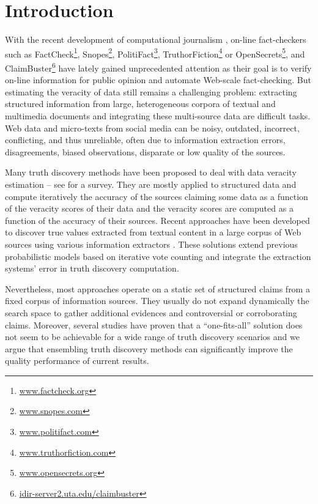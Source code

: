 \section{Introduction}

With the recent development of computational journalism \cite{Cohen2011, Hassan15}, on-line fact-checkers such as FactCheck\footnote{ {\small\url{www.factcheck.org}}}, Snopes\footnote{{\small\url{www.snopes.com}}}, PolitiFact\footnote{{\small \url{www.politifact.com}}}, TruthorFiction\footnote{{\small\url{www.truthorfiction.com}}} or OpenSecrets\footnote{{\small \url{www.opensecrets.org}}}, and ClaimBuster\footnote{{\small\url{idir-server2.uta.edu/claimbuster}}} have lately gained unprecedented attention as their goal is to verify on-line information for  public opinion and automate Web-scale fact-checking.
But estimating the veracity of data still remains  a  challenging problem: extracting structured information from large, heterogeneous corpora of textual and multimedia documents and  integrating these  multi-source data are difficult tasks. Web  data and micro-texts from social media can be noisy, outdated, incorrect, conflicting, and thus unreliable, often due to information extraction errors, disagreements, biased observations, disparate or low quality of the sources. 
 
 Many truth discovery methods have been proposed to deal with data veracity estimation -- see \cite{Berti2015} for a survey. They are mostly applied to structured data and compute iteratively the accuracy of the sources claiming some data as a function of the veracity scores of their data and the veracity scores are computed as a function of the accuracy of their sources. Recent approaches have been developed to discover true values extracted from textual content in a large corpus of Web sources using various information extractors \cite{Dong2014,YuHCJWZHVM14}.  
These solutions extend previous probabilistic models based on iterative vote counting and integrate the extraction systems' error in truth discovery computation.
 
 Nevertheless, most approaches operate on a static set of structured claims from a fixed corpus of information sources. They usually do not expand dynamically the search space to gather additional evidences and controversial or corroborating claims. Moreover, several studies have proven that a ``one-fits-all'' solution does not seem to be achievable for a wide range of truth discovery scenarios \cite{Wagui14} and we argue that ensembling truth discovery methods can significantly improve the quality performance of current results.
 
